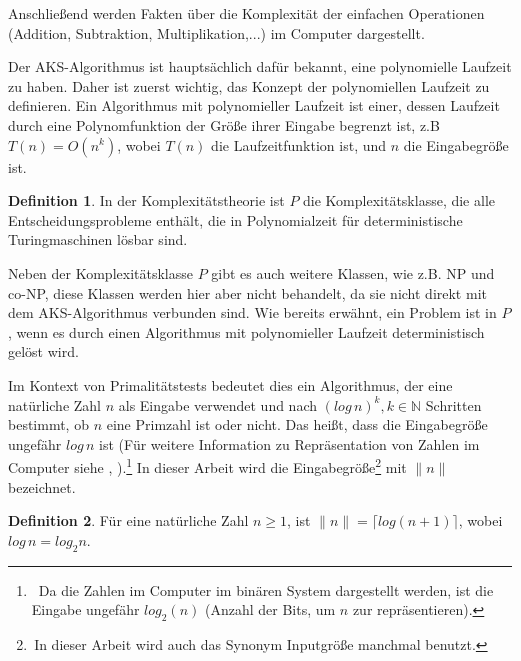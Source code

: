 \documentclass[12pt,oneside]{article}
\theoremstyle{remark}
\theoremstyle{definition}
\newtheorem{definition}{Definition}[section]
\begin{document}
Anschließend werden Fakten über die Komplexität der einfachen Operationen (Addition, Subtraktion, Multiplikation,...) im Computer dargestellt.\newline\newline 


Der AKS-Algorithmus ist hauptsächlich dafür bekannt, eine polynomielle Laufzeit zu haben. Daher ist zuerst wichtig, das Konzept der polynomiellen Laufzeit zu definieren. Ein Algorithmus mit polynomieller Laufzeit ist einer, dessen Laufzeit durch eine Polynomfunktion der Größe ihrer Eingabe begrenzt ist, z.B $T(n) = O(n^k)$, wobei $T(n)$ die Laufzeitfunktion ist, und $n$ die Eingabegröße ist. 

\begin{definition}
In der Komplexitätstheorie ist $P$ die Komplexitätsklasse, die alle Entscheidungsprobleme enthält, die in Polynomialzeit für deterministische Turingmaschinen lösbar sind. 
\end{definition}



Neben der Komplexitätsklasse $P$ gibt es auch weitere Klassen, wie z.B. NP und co-NP, diese Klassen werden hier aber nicht behandelt, da sie nicht direkt mit dem AKS-Algorithmus verbunden sind. Wie bereits erwähnt, ein Problem ist in $P$, wenn es durch einen Algorithmus mit polynomieller Laufzeit deterministisch gelöst wird.\newline


Im Kontext von Primalitätstests bedeutet dies ein Algorithmus, der eine natürliche Zahl $n$ als Eingabe verwendet und nach $(log \,n)^k, k \in \mathbb{N}$ Schritten bestimmt, ob $n$ eine Primzahl ist oder nicht. Das heißt, dass die Eingabegröße ungefähr $log \, n$ ist (Für weitere Information zu Repräsentation von Zahlen im Computer siehe \cite{D73}, \cite{computer-algebra}).\footnote{$\,$ Da die Zahlen im Computer im binären System dargestellt werden, ist die Eingabe ungefähr $log_2(n)$ (Anzahl der Bits, um $n$ zur repräsentieren).} In dieser Arbeit wird die Eingabegröße\footnote{$\, $In dieser Arbeit wird auch das Synonym Inputgröße manchmal benutzt.} mit $\lVert n \rVert$ bezeichnet.   

\begin{definition}
Für eine natürliche Zahl $n \geq 1$, ist $\lVert n \rVert= \lceil log(n + 1) \rceil$, wobei $log \, n = log_{2} n$.
\end{definition}
\end{document}
